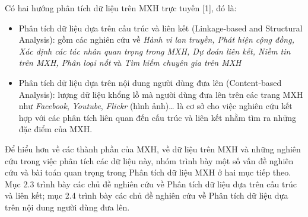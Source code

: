\documentclass[12pt]{extarticle}
\begin{document}
			\par Có hai hướng phân tích dữ liệu trên MXH trực tuyến [1], đó là:
			\begin{itemize}
				\item{Phân tích dữ liệu dựa trên cấu trúc và liên kết (Linkage-based and Structural Analysis): gồm các nghiên cứu về \textit{Hành vi lan truyền, Phát hiện cộng đồng, Xác định các tác nhân quan trọng trong MXH, Dự đoán liên kết, Niềm tin trên MXH, Phân loại nốt} và \textit{Tìm kiếm chuyên gia trên MXH}}	
				\item{Phân tích dữ liệu dựa trên nội dung người dùng đưa lên (Content-based Analysis): lượng dữ liệu khổng lồ mà người dùng đưa lên trên các trang MXH như \textit{Facebook}, \textit{Youtube}, \textit{Flickr} (hình ảnh)… là cơ sở cho việc nghiên cứu kết hợp với các phân tích liên quan đến cấu trúc và liên kết nhằm tìm ra những đặc điểm của MXH.}
			\end{itemize}
			\par Để hiểu hơn về các thành phần của MXH, về dữ liệu trên MXH và những nghiên cứu trong việc phân tích các dữ liệu này, nhóm trình bày một số vấn đề nghiên cứu và bài toán quan trọng trong Phân tích dữ liệu MXH ở hai mục tiếp theo. Mục 2.3 trình bày các chủ đề nghiên cứu về Phân tích dữ liệu dựa trên cấu trúc và liên kết; mục 2.4 trình bày các chủ đề nghiên cứu về Phân tích dữ liệu dựa trên nội dung người dùng đưa lên.
\end{document}
